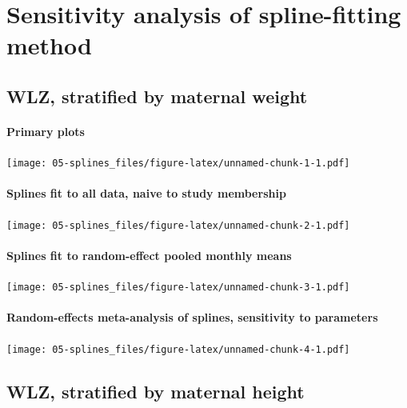\documentclass[9pt,]{book}
\begin{document}
\chapter{Sensitivity analysis of spline-fitting method}\label{spline}

\raggedright

\section{WLZ, stratified by maternal
weight}\label{wlz-stratified-by-maternal-weight}

\subsubsection{Primary plots}\label{primary-plots}

\texttt{[image: 05-splines\_files/figure-latex/unnamed-chunk-1-1.pdf]}

\subsubsection{Splines fit to all data, naive to study
membership}\label{splines-fit-to-all-data-naive-to-study-membership}

\texttt{[image: 05-splines\_files/figure-latex/unnamed-chunk-2-1.pdf]}

\subsubsection{Splines fit to random-effect pooled monthly
means}\label{splines-fit-to-random-effect-pooled-monthly-means}

\texttt{[image: 05-splines\_files/figure-latex/unnamed-chunk-3-1.pdf]}

\subsubsection{Random-effects meta-analysis of splines, sensitivity to
parameters}\label{random-effects-meta-analysis-of-splines-sensitivity-to-parameters}

\texttt{[image: 05-splines\_files/figure-latex/unnamed-chunk-4-1.pdf]}

\section{WLZ, stratified by maternal
height}\label{wlz-stratified-by-maternal-height}
\end{document}
